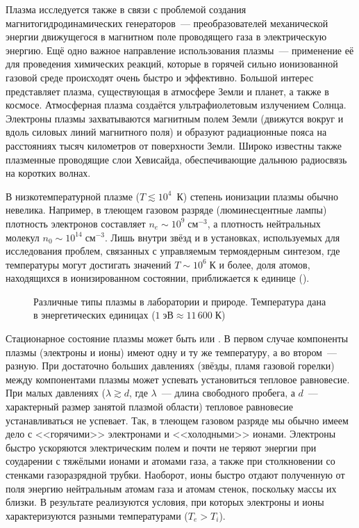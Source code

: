 Плазма исследуется также в связи с проблемой создания магнитогидродинамических
генераторов~--- преобразователей
механической энергии движущегося в магнитном поле проводящего газа в
электрическую энергию. Ещё одно важное направление использования плазмы~---
применение её для проведения химических реакций, которые в горячей
сильно ионизованной газовой среде происходят очень быстро и эффективно.
Большой интерес представляет плазма, существующая в атмосфере Земли и планет, а
также в космосе. Атмосферная плазма создаётся ультрафиолетовым излучением
Солнца. Электроны плазмы захватываются магнитным полем Земли (движутся вокруг и
вдоль силовых линий магнитного поля) и образуют радиационные пояса на
расстояниях тысяч километров от поверхности Земли. Широко известны также
плазменные проводящие слои Хевисайда, обеспечивающие дальнюю радиосвязь
на коротких волнах.

В низкотемпературной плазме ($T\lesssim 10^4$~К) степень ионизации плазмы
обычно невелика. Например, в тлеющем газовом разряде (люминесцентные лампы)
плотность электронов составляет $n_e\sim 10^9\;\text{см}^{-3}$,
а плотность нейтральных молекул $n_0\sim 10^{14}\;\text{см}^{-3}$.
Лишь внутри звёзд и в установках, используемых для исследования проблем,
связанных с управляемым термоядерным синтезом,
где температуры могут достигать значений $T \sim 10^{6}\;К$ и более,
доля атомов, находящихся в ионизированном состоянии, приближается
к единице ().

\begin{figure}[ht]
    \centering
    \caption{Различные типы плазмы в лаборатории и природе. Температура
    дана в энергетических единицах ($1\;эВ\approx 11\,600\;К$)}
\end{figure}

Стационарное состояние плазмы может быть
 или .
В первом случае компоненты плазмы (электроны и ионы) имеют одну и ту же температуру,
а во втором~--- разную. При достаточно больших
давлениях (звёзды, пламя газовой горелки) между компонентами плазмы может
успевать установиться тепловое равновесие. При
малых давлениях ($\lambda\gtrsim d$, где $\lambda$~--- длина свободного пробега, а
$d$~--- характерный размер занятой
плазмой области) тепловое равновесие устанавливаться не успевает.
Так, в тлеющем газовом разряде мы обычно имеем дело с
<<горячими>> электронами и <<холодными>> ионами.
Электроны быстро ускоряются электрическим полем и почти не теряют
энергии при соударении с тяжёлыми ионами и атомами газа, а также при
столкновении со стенками газоразрядной трубки. Наоборот, ионы быстро отдают
полученную от поля энергию нейтральным атомам газа и атомам стенок, поскольку
массы их близки. В результате реализуются условия, при которых электроны
и ионы характеризуются разными температурами ($T_e > T_i$).

